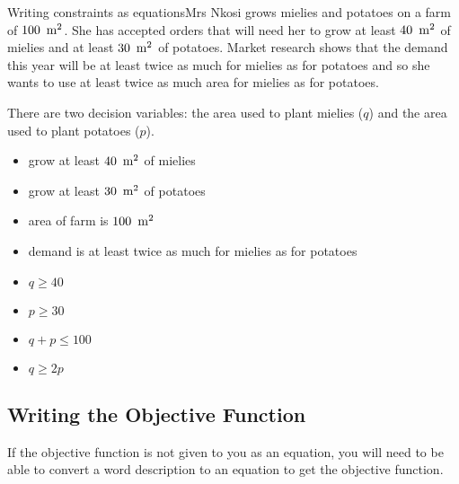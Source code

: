 \begin{wex}{Writing constraints as equations}{Mrs Nkosi grows mielies and potatoes on a farm of $100~\,\rm{m}^2$. She has accepted orders that will need her to grow at least $40~\,\rm{m}^2$ of mielies and at least $30~\,\rm{m}^2$ of potatoes. Market research shows that the demand this year will be at least twice as much for mielies as for potatoes and so she wants to use at least twice as much area for mielies as for potatoes.}
{
There are two decision variables: the area used to plant mielies ($q$) and the area used to plant potatoes ($p$).

\begin{itemize}
\item{grow at least $40~\,\rm{m}^2$ of mielies}
\item{grow at least $30~\,\rm{m}^2$ of potatoes}
\item{area of farm is $100~\,\rm{m}^2$}
\item{demand is at least twice as much for mielies as for potatoes}
\end{itemize}

\begin{itemize}
\item{$q \geq 40$}
\item{$p \geq 30$}
\item{$q+p \leq 100$}
\item{$q\geq 2p$}
\end{itemize}
}
\end{wex}


\subsection{Writing the Objective Function}
If the objective function is not given to you as an equation, you will need to be able to convert a word description to an equation to get the objective function. 

